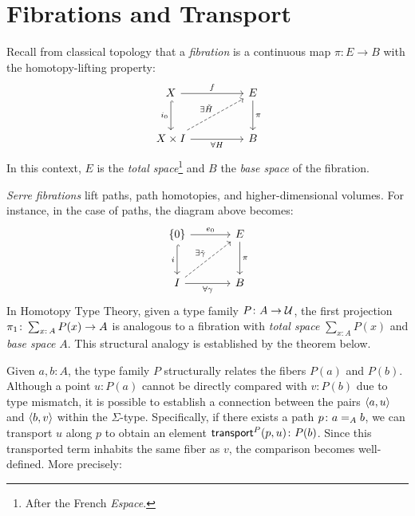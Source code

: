 \section{Fibrations and Transport}

\label{rem:fibration}
Recall from classical topology that a \textsl{fibration} is a continuous map $\pi\colon E\to B$ with the homotopy-lifting property:
\[
    \begin{tikzcd}[row sep=large, column sep=huge]
        X
            \arrow[r,"f"]
            \arrow[d,hook,"i_0"']
        &E
            \arrow[d,"\pi"] \\
        X\times I
            \arrow[r,"\forall H"']
            \arrow[ur,dashed,"\exists\tilde{H}"]
        &B
    \end{tikzcd}
\]
In this context, $E$ is the \textsl{total space}\footnote{After the French \textit{Espace}.} and $B$ the \textsl{base space} of the fibration.

\textsl{Serre fibrations} lift paths, path homotopies, and higher-dimensional volumes. For instance, in the case of paths, the diagram above becomes:
\[
    \begin{tikzcd}[row sep=large, column sep=large]
        \{0\}
            \arrow[r,"e_0"]
            \arrow[d,hook,"i"']
        & E
            \arrow[d,"\pi"] \\
        I
            \arrow[r,"\forall\gamma"']
            \arrow[ur,dashed,"\exists\tilde{\gamma}"]
        & B
    \end{tikzcd}
\]
In Homotopy Type Theory, given a type family $P\colon A\to\univ$, the first projection $\fun{\pi}_1\colon \sum_{x\colon A}P(x)\to A$ is analogous to a fibration with \textsl{total space} $\sum_{x\colon A}P(x)$ and \textsl{base space} $A$. This structural analogy is established by the theorem below.

Given $a,b\colon A$, the type family $P$ structurally relates the fibers $P(a)$ and $P(b)$. Although a point $u\colon P(a)$ cannot be directly compared with $v\colon P(b)$ due to type mismatch, it is possible to establish a connection between the pairs $\langle a,u\rangle$ and $\langle b,v\rangle$ within the $\Sigma$-type. Specifically, if there exists a path $p\colon a\eq A b$, we can transport $u$ along $p$ to obtain an element $\fun{transport}^P(p,u)\colon P(b)$. Since this transported term inhabits the same fiber as $v$, the comparison becomes well-defined. More precisely:

